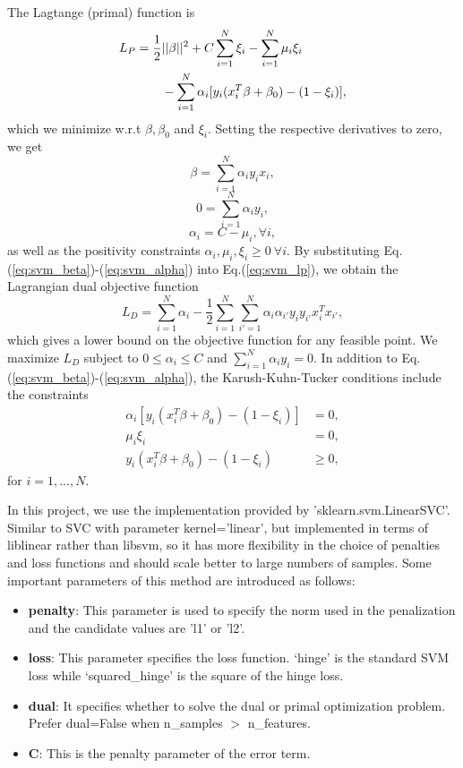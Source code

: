 \documentclass[10pt,journal,compsoc]{IEEEtran}
\begin{document}
The Lagtange (primal) function is
\begin{align}
  \label{eq:svm_lp}
  L_P = \frac{1}{2}&||\beta||^2 + C\sum_{i=1}^N\xi_i - \sum_{i=1}^N\mu_i\xi_i \\
  &- \sum_{i=1}^N\alpha_i[y_i(x_i^T\beta + \beta_0) - (1 - \xi_i)], \notag
\end{align}
which we minimize w.r.t $\beta, \beta_0$ and $\xi_i$. Setting the respective derivatives to zero, we get
\begin{equation}
  \label{eq:svm_beta}
  \beta = \sum_{i=1}^N\alpha_i y_i x_i,
\end{equation}
\begin{equation}
  \label{eq:svm_0}
  0 = \sum_{i=1}^N\alpha_i y_i,
\end{equation}
\begin{equation}
  \label{eq:svm_alpha}
  \alpha_i = C - \mu_i, \forall i,
\end{equation}
as well as the positivity constraints $\alpha_i, \mu_i, \xi_i \geq 0\ \forall i$. By substituting Eq.(\ref{eq:svm_beta})-(\ref{eq:svm_alpha}) into Eq.(\ref{eq:svm_lp}), we obtain the Lagrangian dual objective function
\begin{equation}
  L_D = \sum_{i=1}^N\alpha_i - \frac{1}{2}\sum_{i=1}^N\sum_{i'=1}^N\alpha_i\alpha_{i'}y_iy_{i'}x_i^Tx_{i'},
\end{equation}
which gives a lower bound on the objective function for any feasible point. We maximize $L_D$ subject to $0 \leq \alpha_i \leq C$ and $\sum_{i=1}^N\alpha_iy_i = 0$. In addition to Eq.(\ref{eq:svm_beta})-(\ref{eq:svm_alpha}), the Karush-Kuhn-Tucker conditions include the constraints
\begin{align}
  \alpha_i[y_i(x_i^T\beta + \beta_0) - (1 - \xi_i)] &= 0,\\
  \mu_i\xi_i &= 0,\\
  y_i(x_i^T\beta + \beta_0) - (1-\xi_i) &\geq 0,
\end{align}
for $i = 1,...,N$.

In this project, we use the implementation provided by 'sklearn.svm.LinearSVC'. Similar to SVC with parameter kernel=’linear’, but implemented in terms of liblinear rather than libsvm, so it has more flexibility in the choice of penalties and loss functions and should scale better to large numbers of samples. Some important parameters of this method are introduced as follows:
\begin{itemize}
  \item \textbf{penalty}: This parameter is used to specify the norm used in the penalization and the candidate values are 'l1' or 'l2'.
  \item \textbf{loss}: This parameter specifies the loss function. ‘hinge’ is the standard SVM loss while ‘squared\_hinge’ is the square of the hinge loss.
  \item \textbf{dual}: It specifies whether to solve the dual or primal optimization problem. Prefer dual=False when n\_samples $>$ n\_features.
  \item \textbf{C}: This is the penalty parameter of the error term.
\end{itemize}
\end{document}
